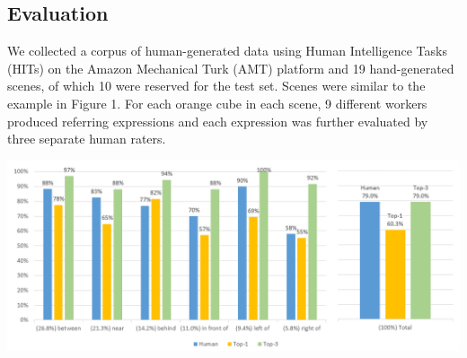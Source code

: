\documentclass[landscape,a0b]{a0poster}
\numberwithin{equation}{section}
\begin{document}
\begin{multicols*}{3}
\section{Evaluation} 

\begin{large}

We collected a corpus of human-generated data using Human Intelligence Tasks (HITs) on the Amazon Mechanical Turk (AMT) platform and 19 hand-generated scenes, of which 10 were reserved for the test set. Scenes were similar to the example in Figure 1.  For each orange cube in each scene, 9 different workers produced  referring expressions and each expression was further evaluated by three separate human raters. 
\end{large}

\begin{center}
\includegraphics[width=0.9\columnwidth]{perf_graph}


\end{center}
\end{multicols*}
\end{document}
